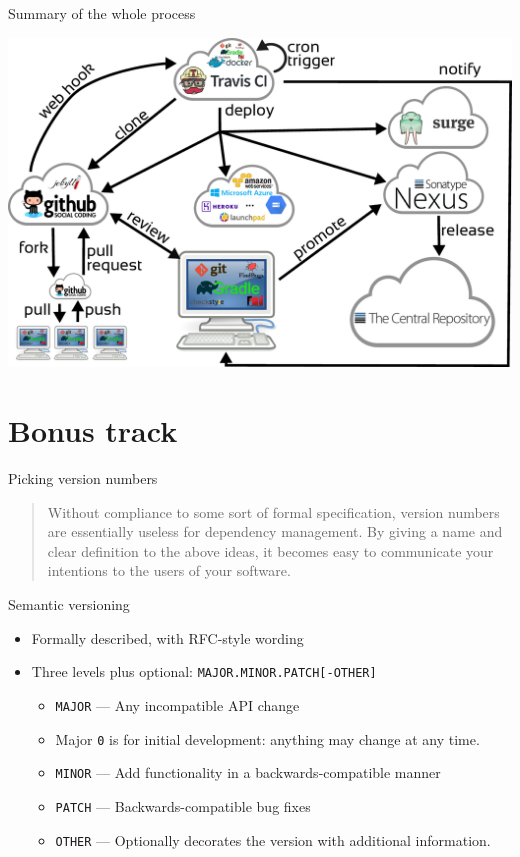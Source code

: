 \documentclass[presentation]{beamer}
\begin{document}
\begin{frame}[fragile]{Summary of the whole process}
	\begin{center}
		\includegraphics[width=.9\textwidth]{images/ci}
	\end{center}
\end{frame}

\section*{Bonus track}

\begin{frame}[fragile]{Picking version numbers}
	\begin{quote}
		Without compliance to some sort of formal specification, version numbers are essentially useless for dependency management. By giving a name and clear definition to the above ideas, it becomes easy to communicate your intentions to the users of your software.
		\begin{flushright}
		\end{flushright}
	\end{quote}
	\begin{block}{Semantic versioning}
		\begin{itemize}
			\item Formally described, with RFC-style wording
			\item Three levels plus optional: \texttt{MAJOR.MINOR.PATCH[-OTHER]}
			\begin{itemize}
				\item \texttt{MAJOR} --- Any incompatible API change
				\item Major \texttt{0} is for initial development: anything may change at any time.
				\item \texttt{MINOR} --- Add functionality in a backwards-compatible manner
				\item \texttt{PATCH} --- Backwards-compatible bug fixes
				\item \texttt{OTHER} --- Optionally decorates the version with additional information.
			\end{itemize}
		\end{itemize}
	\end{block}
\end{frame}
\end{document}
